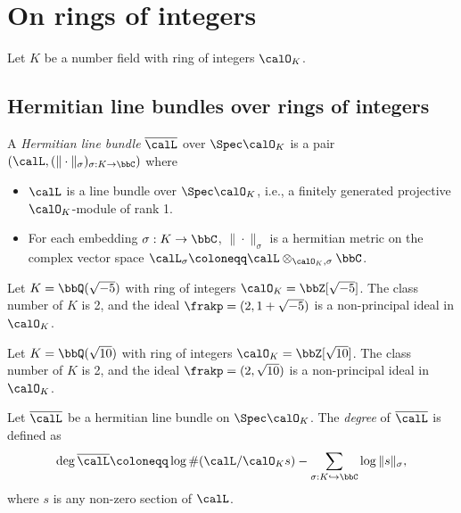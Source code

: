 \section{On rings of integers}

Let \(K\) be a number field with ring of integers \(\calO_K\). 

\subsection{Hermitian line bundles over rings of integers}

    \begin{definition}\label{def:hermitian_line_bundles_over_rings_of_integers}
        A \emph{Hermitian line bundle} \(\overline{\calL}\) over \(\Spec \calO_K\) is a pair \((\calL, (\|\cdot\|_\sigma)_{\sigma: K \to \bbC})\) where
        \begin{itemize}
            \item \(\calL\) is a line bundle over \(\Spec \calO_K\), i.e., a finitely generated projective \(\calO_K\)-module of rank 1.
            \item For each embedding \(\sigma: K \to \bbC\), \(\|\cdot\|_\sigma\) is a hermitian metric on the complex vector space \(\calL_\sigma \coloneqq \calL \otimes_{\calO_K, \sigma} \bbC\).
        \end{itemize}
    \end{definition}

    \begin{example}\label{eg:hermitian_line_bundle_on_Q_sqrt_minus_5}
        Let \(K = \bbQ(\sqrt{-5})\) with ring of integers \(\calO_K = \bbZ[\sqrt{-5}]\).
        The class number of \(K\) is 2, and the ideal \(\frakp = (2, 1 + \sqrt{-5})\) is a non-principal ideal in \(\calO_K\).

        \Yang{}
        
    \end{example}

    \begin{example}\label{eg:hermitian_line_bundle_on_Q_sqrt_10}
        Let \(K = \bbQ(\sqrt{10})\) with ring of integers \(\calO_K = \bbZ[\sqrt{10}]\).
        The class number of \(K\) is 2, and the ideal \(\frakp = (2, \sqrt{10})\) is a non-principal ideal in \(\calO_K\).

    \end{example}

    \begin{definition}\label{def:arithmetic_degree_of_hermitian_line_bundles}
        Let \(\overline{\calL}\) be a hermitian line bundle on \(\Spec \calO_K\). 
        The \emph{degree} of \(\overline{\calL}\) is defined as
        \[
            \deg \overline{\calL} \coloneqq \log \#(\calL / \calO_K s) - \sum_{\sigma: K \hookrightarrow \bbC} \log \|s\|_\sigma,
        \]
        where \(s\) is any non-zero section of \(\calL\).
    \end{definition}

